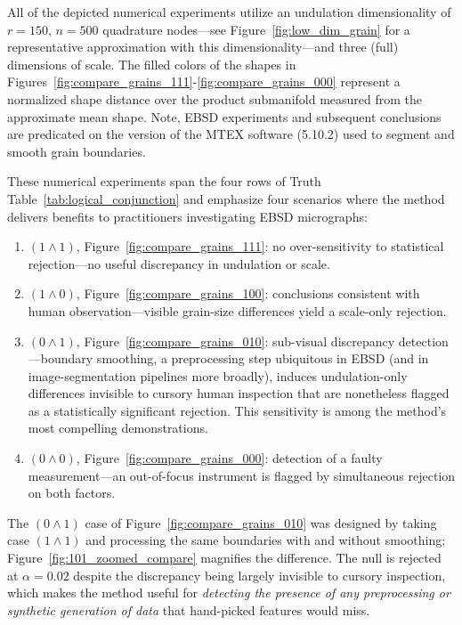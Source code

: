 \documentclass[pdflatex,iicol]{sn-jnl}%
\theoremstyle{thmstyleone}%
\theoremstyle{thmstyletwo}%
\theoremstyle{thmstylethree}%
\begin{document}
All of the depicted numerical experiments utilize an undulation dimensionality of $r=150$, $n=500$ quadrature nodes---see Figure~\ref{fig:low_dim_grain} for a representative approximation with this dimensionality---and three (full) dimensions of scale. The filled colors of the shapes in Figures~\ref{fig:compare_grains_111}-\ref{fig:compare_grains_000} represent a normalized shape distance over the product submanifold measured from the approximate mean shape. Note, EBSD experiments and subsequent conclusions are predicated on the version of the MTEX software (5.10.2) used to segment and smooth grain boundaries.

These numerical experiments span the four rows of Truth Table~\ref{tab:logical_conjunction} and emphasize four scenarios where the method delivers benefits to practitioners investigating EBSD micrographs:
\begin{enumerate}[label=\roman*)]
    \item $(1\wedge 1)$, Figure~\ref{fig:compare_grains_111}: no over-sensitivity to statistical rejection---no useful discrepancy in undulation or scale.
    \item $(1\wedge 0)$, Figure~\ref{fig:compare_grains_100}: conclusions consistent with human observation---visible grain-size differences yield a scale-only rejection.
    \item $(0\wedge 1)$, Figure~\ref{fig:compare_grains_010}: sub-visual discrepancy detection---boundary smoothing, a preprocessing step ubiquitous in EBSD (and in image-segmentation pipelines more broadly), induces undulation-only differences invisible to cursory human inspection that are nonetheless flagged as a statistically significant rejection. This sensitivity is among the method's most compelling demonstrations.
    \item $(0\wedge 0)$, Figure~\ref{fig:compare_grains_000}: detection of a faulty measurement---an out-of-focus instrument is flagged by simultaneous rejection on both factors.
\end{enumerate}

The $(0\wedge 1)$ case of Figure~\ref{fig:compare_grains_010} was designed by taking case $(1\wedge 1)$ and processing the same boundaries with and without smoothing; Figure~\ref{fig:101_zoomed_compare} magnifies the difference. The null is rejected at $\alpha = 0.02$ despite the discrepancy being largely invisible to cursory inspection, which makes the method useful for \textit{detecting the presence of any preprocessing or synthetic generation of data} that hand-picked features would miss.
\end{document}
